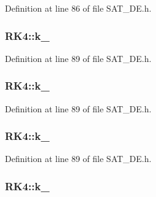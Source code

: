 Definition at line 86 of file S\-A\-T\-\_\-\-D\-E.\-h.

\hypertarget{classRK4_aa3d2325410885022b4dc0caa24c924e1}{
\subsubsection[{k\-\_\-1}]{ R\-K4\-::k\-\_\hspace{0.3cm}{\ttfamily [private]}}}\label{classRK4_aa3d2325410885022b4dc0caa24c924e1}


Definition at line 89 of file S\-A\-T\-\_\-\-D\-E.\-h.

\hypertarget{classRK4_af6bc3c10af06bb72e70e733bf8c3d70b}{
\subsubsection[{k\-\_\-2}]{ R\-K4\-::k\-\_\hspace{0.3cm}{\ttfamily [private]}}}\label{classRK4_af6bc3c10af06bb72e70e733bf8c3d70b}


Definition at line 89 of file S\-A\-T\-\_\-\-D\-E.\-h.

\hypertarget{classRK4_ac3c630bd4db23608b13bc39f1e2c2c74}{
\subsubsection[{k\-\_\-3}]{ R\-K4\-::k\-\_\hspace{0.3cm}{\ttfamily [private]}}}\label{classRK4_ac3c630bd4db23608b13bc39f1e2c2c74}


Definition at line 89 of file S\-A\-T\-\_\-\-D\-E.\-h.

\hypertarget{classRK4_af1f64db1e590871b631da2323a63d5b7}{
\subsubsection[{k\-\_\-4}]{ R\-K4\-::k\-\_\hspace{0.3cm}{\ttfamily [private]}}}\label{classRK4_af1f64db1e590871b631da2323a63d5b7}


